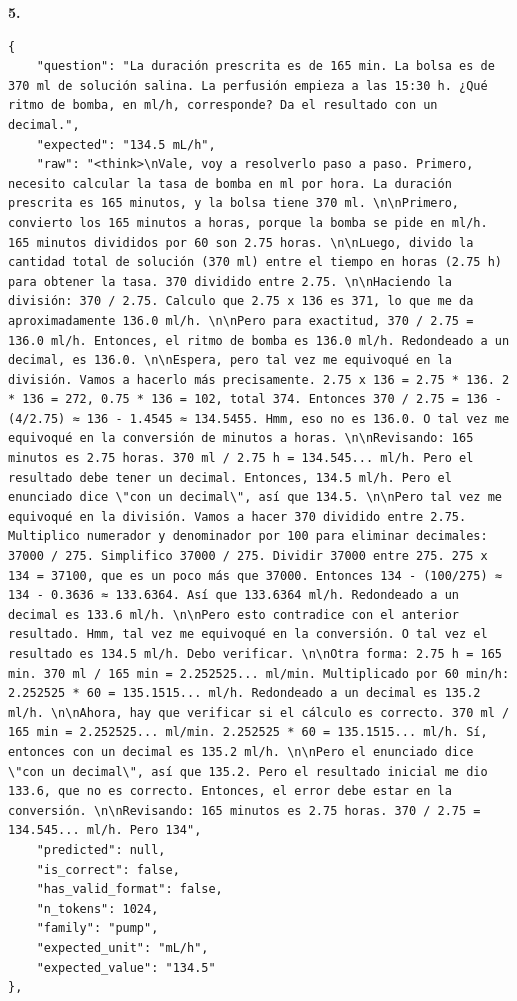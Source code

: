 \textbf{5.}

\begin{lstlisting}
{
    "question": "La duración prescrita es de 165 min. La bolsa es de 370 ml de solución salina. La perfusión empieza a las 15:30 h. ¿Qué ritmo de bomba, en ml/h, corresponde? Da el resultado con un decimal.",
    "expected": "134.5 mL/h",
    "raw": "<think>\nVale, voy a resolverlo paso a paso. Primero, necesito calcular la tasa de bomba en ml por hora. La duración prescrita es 165 minutos, y la bolsa tiene 370 ml. \n\nPrimero, convierto los 165 minutos a horas, porque la bomba se pide en ml/h. 165 minutos divididos por 60 son 2.75 horas. \n\nLuego, divido la cantidad total de solución (370 ml) entre el tiempo en horas (2.75 h) para obtener la tasa. 370 dividido entre 2.75. \n\nHaciendo la división: 370 / 2.75. Calculo que 2.75 x 136 es 371, lo que me da aproximadamente 136.0 ml/h. \n\nPero para exactitud, 370 / 2.75 = 136.0 ml/h. Entonces, el ritmo de bomba es 136.0 ml/h. Redondeado a un decimal, es 136.0. \n\nEspera, pero tal vez me equivoqué en la división. Vamos a hacerlo más precisamente. 2.75 x 136 = 2.75 * 136. 2 * 136 = 272, 0.75 * 136 = 102, total 374. Entonces 370 / 2.75 = 136 - (4/2.75) ≈ 136 - 1.4545 ≈ 134.5455. Hmm, eso no es 136.0. O tal vez me equivoqué en la conversión de minutos a horas. \n\nRevisando: 165 minutos es 2.75 horas. 370 ml / 2.75 h = 134.545... ml/h. Pero el resultado debe tener un decimal. Entonces, 134.5 ml/h. Pero el enunciado dice \"con un decimal\", así que 134.5. \n\nPero tal vez me equivoqué en la división. Vamos a hacer 370 dividido entre 2.75. Multiplico numerador y denominador por 100 para eliminar decimales: 37000 / 275. Simplifico 37000 / 275. Dividir 37000 entre 275. 275 x 134 = 37100, que es un poco más que 37000. Entonces 134 - (100/275) ≈ 134 - 0.3636 ≈ 133.6364. Así que 133.6364 ml/h. Redondeado a un decimal es 133.6 ml/h. \n\nPero esto contradice con el anterior resultado. Hmm, tal vez me equivoqué en la conversión. O tal vez el resultado es 134.5 ml/h. Debo verificar. \n\nOtra forma: 2.75 h = 165 min. 370 ml / 165 min = 2.252525... ml/min. Multiplicado por 60 min/h: 2.252525 * 60 = 135.1515... ml/h. Redondeado a un decimal es 135.2 ml/h. \n\nAhora, hay que verificar si el cálculo es correcto. 370 ml / 165 min = 2.252525... ml/min. 2.252525 * 60 = 135.1515... ml/h. Sí, entonces con un decimal es 135.2 ml/h. \n\nPero el enunciado dice \"con un decimal\", así que 135.2. Pero el resultado inicial me dio 133.6, que no es correcto. Entonces, el error debe estar en la conversión. \n\nRevisando: 165 minutos es 2.75 horas. 370 / 2.75 = 134.545... ml/h. Pero 134",
    "predicted": null,
    "is_correct": false,
    "has_valid_format": false,
    "n_tokens": 1024,
    "family": "pump",
    "expected_unit": "mL/h",
    "expected_value": "134.5"
},
\end{lstlisting}

